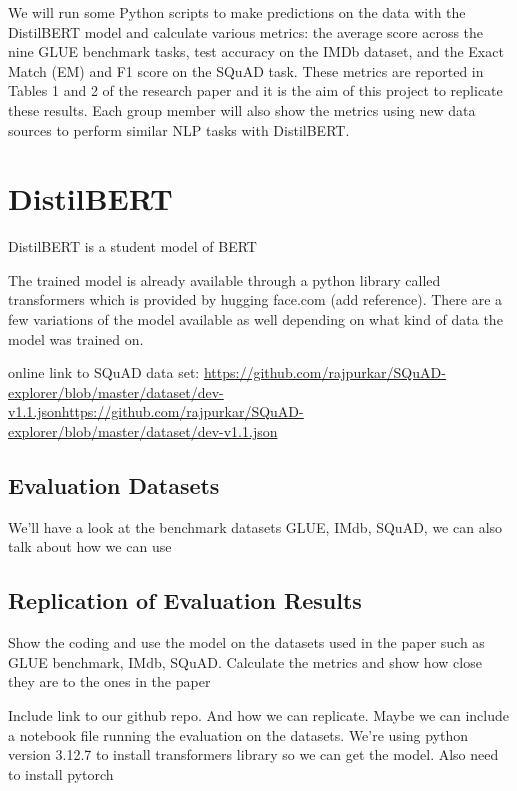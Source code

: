 \documentclass[
  11pt,
]{article}
\begin{document}
We will run some Python scripts to make predictions on the data with the
DistilBERT model and calculate various metrics: the average score across
the nine GLUE benchmark tasks, test accuracy on the IMDb dataset, and
the Exact Match (EM) and F1 score on the SQuAD task. These metrics are
reported in Tables 1 and 2 of the research paper and it is the aim of
this project to replicate these results. Each group member will also
show the metrics using new data sources to perform similar NLP tasks
with DistilBERT.

\section{DistilBERT}\label{distilbert}

DistilBERT is a student model of BERT

The trained model is already available through a python library called
transformers which is provided by hugging face.com (add reference).
There are a few variations of the model available as well depending on
what kind of data the model was trained on.

online link to SQuAD data set:
\href{https://github.com/rajpurkar/SQuAD-explorer/blob/master/dataset/dev-v1.1.json}{https://github.com/rajpurkar/SQuAD-explorer/blob/master/dataset/dev-v1.1.jsonhttps://github.com/rajpurkar/SQuAD-explorer/blob/master/dataset/dev-v1.1.json}

\subsection{Evaluation Datasets}\label{evaluation-datasets}

We'll have a look at the benchmark datasets GLUE, IMdb, SQuAD, we can
also talk about how we can use

\subsection{Replication of Evaluation
Results}\label{replication-of-evaluation-results}

Show the coding and use the model on the datasets used in the paper such
as GLUE benchmark, IMdb, SQuAD. Calculate the metrics and show how close
they are to the ones in the paper

Include link to our github repo. And how we can replicate. Maybe we can
include a notebook file running the evaluation on the datasets. We're
using python version 3.12.7 to install transformers library so we can
get the model. Also need to install pytorch
\end{document}
